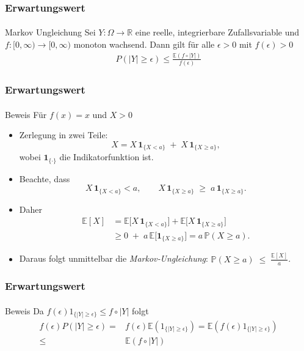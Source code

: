 \documentclass{beamer}
\renewcommand{\Pr}{\mathbb{P}}
\begin{document}
\begin{frame}
    \frametitle{Erwartungswert}
\framesubtitle{}
\begin{block}{Markov Ungleichung}
Sei $Y : \Omega \to \mathbb{R}$  eine  reelle, integrierbare  Zufallsvariable und $f : [0, \infty) \to [0, \infty)$ monoton wachsend.
Dann gilt für alle $\epsilon > 0$ mit $f(\epsilon) > 0$
\begin{align*}
P (|Y |  \geq \epsilon) \leq \frac{\mathbb{E} (f \circ |Y|)}{f(\epsilon)}
\end{align*}
\end{block}

 \end{frame}


 \begin{frame}
    \frametitle{Erwartungswert}
\framesubtitle{}

\begin{block}{Beweis}
    Für $f(x)=x$ und $ X > 0$
\begin{itemize}
   
  \item Zerlegung in zwei Teile:
    \[
      X = X \,\mathbf{1}_{\{X<a\}} \;+\; X \,\mathbf{1}_{\{X\ge a\}},
    \]
    wobei $\mathbf{1}_{\{\cdot\}}$ die Indikatorfunktion ist.
  \item Beachte, dass
    \[
      X\,\mathbf{1}_{\{X<a\}} < a,
      \qquad
      X\,\mathbf{1}_{\{X\ge a\}} \;\ge\; a\,\mathbf{1}_{\{X\ge a\}}.
    \]
  \item Daher
    \[
      \begin{aligned}
        \mathbb{E}[X]
        &= \mathbb{E}\bigl[X\,\mathbf{1}_{\{X<a\}}\bigr]
         + \mathbb{E}\bigl[X\,\mathbf{1}_{\{X\ge a\}}\bigr] \\
        &\ge 0 \;+\; a\,\mathbb{E}\bigl[\mathbf{1}_{\{X\ge a\}}\bigr]
         = a\,\Pr(X \ge a).
      \end{aligned}
    \]
  \item Daraus folgt unmittelbar die \emph{Markov‐Ungleichung}:
      $\Pr(X \ge a) \;\le\; \frac{\mathbb{E}[X]}{a}$.
\end{itemize}
\end{block}
 \end{frame}


 \begin{frame}
    \frametitle{Erwartungswert}
\framesubtitle{}

\begin{block}{Beweis}
Da $f(\epsilon) 1_{\{ |Y| \geq  \epsilon \} } \leq f \circ |Y|$ folgt
\begin{align*}
f(\epsilon) P(|Y| \geq \epsilon) = & f(\epsilon) \mathbb{E}(1_{\{ |Y| \geq  \epsilon \} }) = \mathbb{E}( f(\epsilon) 1_{\{ |Y| \geq  \epsilon \} }) \\
\leq & \mathbb{E}( f \circ |Y|)
\end{align*}
\end{block}
 \end{frame}
\end{document}
